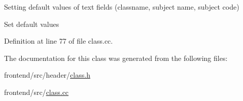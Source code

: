 \-Setting default values of text fields (classname, subject name, subject code) 

\-Set default values 

\-Definition at line 77 of file class.\-cc.



\-The documentation for this class was generated from the following files\-:\begin{DoxyCompactItemize}
\item 
frontend/src/header/\hyperlink{class_8h}{class.\-h}\item 
frontend/src/\hyperlink{class_8cc}{class.\-cc}\end{DoxyCompactItemize}
